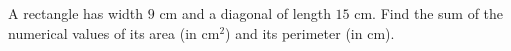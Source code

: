 A rectangle has width $9$ cm and a diagonal of length $15$ cm. Find the sum of the numerical values of its area (in $\text{cm}^2$) and its perimeter (in cm).
